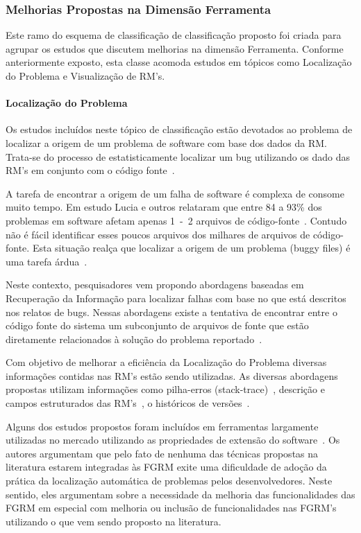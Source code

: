 \subsubsection{Melhorias Propostas na Dimensão Ferramenta}
\label{ssub:melhorias_dim_ferramenta}

Este ramo do esquema de classificação de classificação proposto foi criada para
agrupar os estudos que discutem melhorias na dimensão Ferramenta. Conforme
anteriormente exposto, esta classe acomoda estudos em tópicos como Localização
	do Problema e Visualização de RM's.
\paragraph{Localização do Problema}
Os estudos incluídos neste tópico de classificação estão devotados ao problema
de localizar a origem de um problema de software com base dos dados da RM\@.
Trata-se do processo de estatisticamente localizar um bug utilizando os dado das
RM's em conjunto com o código fonte~\cite{Hovemeyer:2004:FBE:1052883.1052895}.

A tarefa de encontrar a origem de um falha de software é complexa de consome
muito tempo. Em estudo Lucia e outros relataram que entre 84 a 93\% dos
problemas em software afetam apenas 1~-~2 arquivos de
código-fonte~\cite{thung2012faults}. Contudo não é fácil identificar esses
poucos arquivos dos milhares de arquivos de código-fonte. Esta situação
realça que localizar a origem de um problema (buggy files) é uma tarefa
árdua~\cite{Thung:2014:BIT:2635868.2661678}.

Neste contexto, pesquisadores vem propondo abordagens baseadas em
Recuperação da Informação para localizar falhas com base no que está descritos
nos relatos de bugs. Nessas abordagens existe a tentativa de encontrar entre
o código fonte do sistema um subconjunto de arquivos de fonte que
estão diretamente relacionados à solução do problema
reportado~\cite{Wong:2014:BBF:2705615.2706096}.

Com objetivo de melhorar a eficiência da Localização do Problema diversas
informações contidas nas RM's estão sendo utilizadas. As diversas abordagens
propostas utilizam informações como pilha-erros
(stack-trace)~\cite{Wong:2014:BBF:2705615.2706096}, descrição e campos
estruturados das RM's~\cite{Thung:2014:BIT:2635868.2661678}, o históricos de
versões~\cite{Bangcharoensap:2012:LSC:2419061.2419428,corley2011recovering,Romo:2015:TAT:2745802.2745833}.

Alguns dos estudos propostos foram incluídos em ferramentas largamente
utilizadas no mercado utilizando as propriedades de extensão do
software~\cite{Thung:2014:BIT:2635868.2661678,corley2011recovering}. Os autores
argumentam que pelo fato de nenhuma das técnicas propostas na literatura
estarem integradas às FGRM exite uma dificuldade de adoção da prática da
localização automática de problemas pelos desenvolvedores. Neste sentido, eles
argumentam sobre a necessidade da melhoria das funcionalidades das FGRM em
especial com melhoria ou inclusão de funcionalidades nas FGRM's utilizando o que
vem sendo proposto na literatura.

